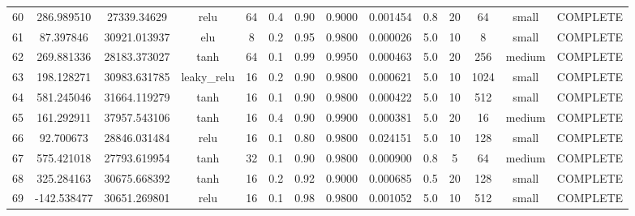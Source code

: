 \begin{longtable}{cccccccccccccc}
                       60 &                 286.989510 &                        27339.34629 &            relu &          64 &         0.4 &        0.90 & 0.9000 &       0.001454 &             0.8 &        20 &       64 &     small & COMPLETE \\
                       61 &                  87.397846 &                       30921.013937 &             elu &           8 &         0.2 &        0.95 & 0.9800 &       0.000026 &             5.0 &        10 &        8 &     small & COMPLETE \\
                       62 &                 269.881336 &                       28183.373027 &            tanh &          64 &         0.1 &        0.99 & 0.9950 &       0.000463 &             5.0 &        20 &      256 &    medium & COMPLETE \\
                       63 &                 198.128271 &                       30983.631785 &     leaky\_relu &          16 &         0.2 &        0.90 & 0.9800 &       0.000621 &             5.0 &        10 &     1024 &     small & COMPLETE \\
                       64 &                 581.245046 &                       31664.119279 &            tanh &          16 &         0.1 &        0.90 & 0.9800 &       0.000422 &             5.0 &        10 &      512 &     small & COMPLETE \\
                       65 &                 161.292911 &                       37957.543106 &            tanh &          16 &         0.4 &        0.90 & 0.9900 &       0.000381 &             5.0 &        20 &       16 &    medium & COMPLETE \\
                       66 &                  92.700673 &                       28846.031484 &            relu &          16 &         0.1 &        0.80 & 0.9800 &       0.024151 &             5.0 &        10 &      128 &     small & COMPLETE \\
                       67 &                 575.421018 &                       27793.619954 &            tanh &          32 &         0.1 &        0.90 & 0.9800 &       0.000900 &             0.8 &         5 &       64 &    medium & COMPLETE \\
                       68 &                 325.284163 &                       30675.668392 &            tanh &          16 &         0.2 &        0.92 & 0.9000 &       0.000685 &             0.5 &        20 &      128 &     small & COMPLETE \\
                       69 &                -142.538477 &                       30651.269801 &            relu &          16 &         0.1 &        0.98 & 0.9800 &       0.001052 &             5.0 &        10 &      512 &     small & COMPLETE \\

\end{longtable}

